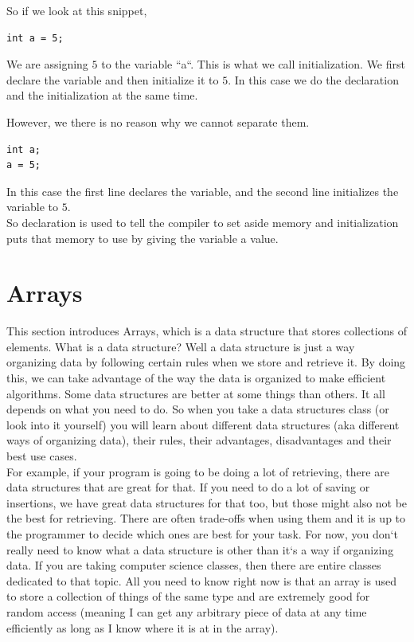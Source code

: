 \documentclass[11]{article}
\begin{document}
So if we look at this snippet, 

\begin{lstlisting}
int a = 5;
\end{lstlisting}

We  are assigning $5$ to the variable ``a``. This is what we call initialization. We first declare the variable and then initialize it to $5$. In this case we do the declaration and the initialization at the same time. 

However, we there is no reason why we cannot separate them.
\begin{lstlisting}
int a;
a = 5;
\end{lstlisting}

In this case the first line declares the variable, and the second line initializes the variable to $5$.\\

So declaration is used to tell the compiler to set aside memory and initialization puts that memory to use by giving the variable a value.

\section{Arrays}
This section introduces Arrays, which is a data structure that stores collections of elements. What is a data structure? Well a data structure is just a way organizing data by following certain rules when we store and retrieve it. By doing this, we can take advantage of the way the data is organized to make efficient algorithms. Some data structures are better at some things than others. It all depends on what you need to do. So when you take a data structures class (or look into it yourself) you will learn about different data structures (aka different ways of organizing data), their rules, their advantages, disadvantages and their best use cases.\\

For example, if your program is going to be doing a lot of retrieving, there are data structures that are great for that. If you need to do a lot of saving or insertions, we have great data structures for that too, but those might also not be the best for retrieving. There are often trade-offs when using them and it is up to the programmer to decide which ones are best for your task. For now, you don`t really need to know what a data structure is other than it`s a way if organizing data. If you are taking computer science classes, then there are entire classes dedicated to that topic. All you need to know right now is that an array is used to store a collection of things of the same type and are extremely good for random access (meaning I can get any arbitrary piece of data at any time efficiently as long as I know where it is at in the array).
\end{document}
